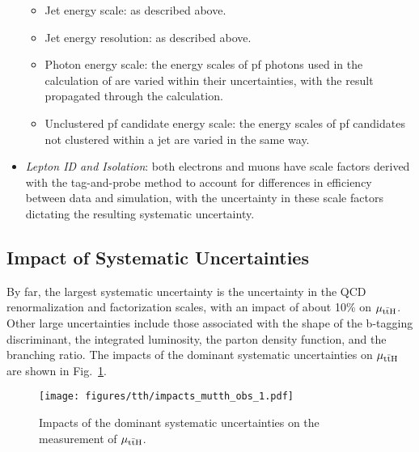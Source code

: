 \begin{itemize}
\begin{itemize}
        \item Jet energy scale: as described above.
        \item Jet energy resolution: as described above.
        \item Photon energy scale: the energy scales of pf photons used in the calculation of \met are varied within their uncertainties, with the result propagated through the \met calculation.
        \item Unclustered pf candidate energy scale: the energy scales of pf candidates not clustered within a jet are varied in the same way. 
    \end{itemize}
    \item \emph{Lepton ID and Isolation}: both electrons and muons have scale factors derived with the tag-and-probe method to account for differences in efficiency between data and simulation, with the uncertainty in these scale factors dictating the resulting systematic uncertainty.
\end{itemize}

\subsection{Impact of Systematic Uncertainties}
By far, the largest systematic uncertainty is the uncertainty in the QCD renormalization and factorization scales, with an impact of about 10\% on $\mu_{\mathrm{t\bar{t}H}}$.
Other large uncertainties include those associated with the shape of the b-tagging discriminant, the integrated luminosity, the parton density function, and the \Hgg branching ratio.
The impacts of the dominant systematic uncertainties on $\mu_{\mathrm{t\bar{t}H}}$ are shown in Fig.~\ref{fig:tth_impacts}.
\begin{figure} [htbp!]
    \centering
    \texttt{[image: figures/tth/impacts\_mutth\_obs\_1.pdf]}
    \caption{Impacts of the dominant systematic uncertainties on the measurement of $\mu_{\mathrm{t\bar{t}H}}$.}
    \label{fig:tth_impacts}
\end{figure}

